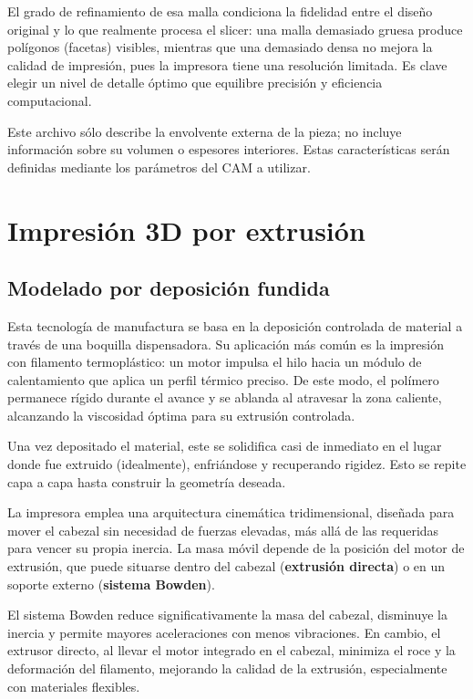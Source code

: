 El grado de refinamiento de esa malla condiciona la fidelidad entre el diseño original y lo que realmente procesa el slicer: una malla demasiado gruesa produce polígonos (facetas) visibles, mientras que una demasiado densa no mejora la calidad de impresión, pues la impresora tiene una resolución limitada. Es clave elegir un nivel de detalle óptimo que equilibre precisión y eficiencia computacional.

Este archivo sólo describe la envolvente externa de la pieza; no incluye información sobre su volumen o espesores interiores. Estas características serán definidas mediante los parámetros del CAM a utilizar.

\section{Impresión 3D por extrusión}

\subsection{Modelado por deposición fundida}

Esta tecnología de manufactura se basa en la deposición controlada de material a través de una boquilla dispensadora. Su aplicación más común es la impresión con filamento termoplástico: un motor impulsa el hilo hacia un módulo de calentamiento que aplica un perfil térmico preciso. De este modo, el polímero permanece rígido durante el avance y se ablanda al atravesar la zona caliente, alcanzando la viscosidad óptima para su extrusión controlada.

Una vez depositado el material, este se solidifica casi de inmediato en el lugar donde fue extruido (idealmente), enfriándose y recuperando rigidez. Esto se repite capa a capa hasta construir la geometría deseada.

La impresora emplea una arquitectura cinemática tridimensional, diseñada para mover el cabezal sin necesidad de fuerzas elevadas, más allá de las requeridas para vencer su propia inercia. La masa móvil depende de la posición del motor de extrusión, que puede situarse dentro del cabezal (\textbf{extrusión directa}) o en un soporte externo (\textbf{sistema Bowden}).

El sistema Bowden reduce significativamente la masa del cabezal, disminuye la inercia y permite mayores aceleraciones con menos vibraciones. En cambio, el extrusor directo, al llevar el motor integrado en el cabezal, minimiza el roce y la deformación del filamento, mejorando la calidad de la extrusión, especialmente con materiales flexibles.

